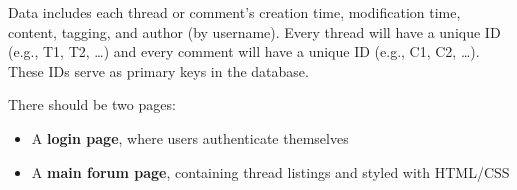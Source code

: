 \documentclass[a4paper,12pt]{article}
\begin{document}
\begin{multicols}{2}
\vspace{10pt}

Data includes each thread or comment’s creation time, modification time, content, tagging, and author (by username). Every thread will have a unique ID (e.g., T1, T2, \dots) and every comment will have a unique ID (e.g., C1, C2, \dots). These IDs serve as primary keys in the database.

\vspace{10pt}

There should be two pages:
\begin{itemize}
    \item A \textbf{login page}, where users authenticate themselves
    \item A \textbf{main forum page}, containing thread listings and styled with HTML/CSS
\end{itemize}


\end{multicols}
\end{document}
